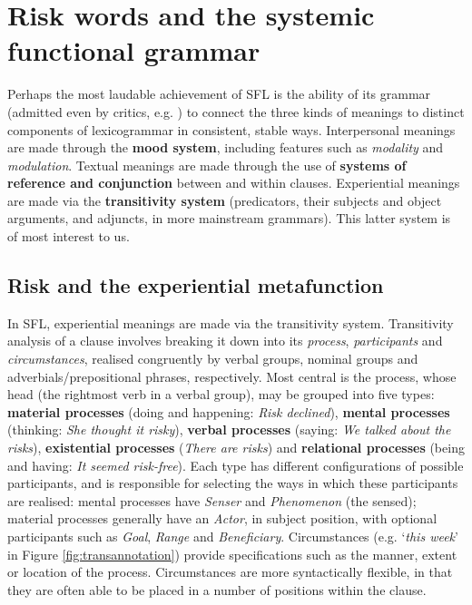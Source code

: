 	\section{Risk words and the systemic functional grammar}

		Perhaps the most laudable achievement of SFL is the ability of its grammar (admitted even by critics, e.g. ) to connect the three kinds of meanings to distinct components of lexicogrammar in consistent, stable ways. Interpersonal meanings are made through the \textbf{mood system}, including features such as \emph{modality} and \emph{modulation}. Textual meanings are made through the use of \textbf{systems of reference and conjunction} between and within clauses. Experiential meanings are made via the \textbf{transitivity system} (predicators, their subjects and object arguments, and adjuncts, in more mainstream grammars). This latter system is of most interest to us.~

		\subsection{Risk and the experiential metafunction}

		In SFL, experiential meanings are made via the transitivity system. Transitivity analysis of a clause involves breaking it down into its \emph{process}, \emph{participants} and \emph{circumstances}, realised congruently by verbal groups, nominal groups and adverbials/prepositional phrases, respectively. Most central is the process, whose head (the rightmost verb in a verbal group), may be grouped into five types: \textbf{material processes} (doing and happening: \emph{Risk declined}), \textbf{mental processes} (thinking: \emph{She thought it risky}), \textbf{verbal processes} (saying: \emph{We talked about the risks}), \textbf{existential processes} (\emph{There are risks}) and \textbf{relational processes} (being and having: \emph{It seemed risk-free}). Each type has different configurations of possible participants, and is responsible for selecting the ways in which these participants are realised: mental processes have \emph{Senser} and \emph{Phenomenon} (the sensed); material processes generally have an \emph{Actor}, in subject position, with optional participants such as \emph{Goal}, \emph{Range} and \emph{Beneficiary}. Circumstances (e.g. `\emph{this week}' in Figure \ref{fig:transannotation}) provide specifications such as the manner, extent or location of the process. Circumstances are more syntactically flexible, in that they are often able to be placed in a number of positions within the clause.

